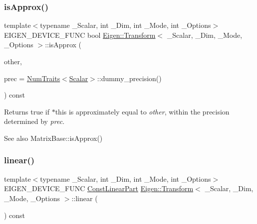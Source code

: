 \subsubsection{\texorpdfstring{isApprox()}{isApprox()}}
{\footnotesize\ttfamily template$<$typename \+\_\+\+Scalar, int \+\_\+\+Dim, int \+\_\+\+Mode, int \+\_\+\+Options$>$ \\
E\+I\+G\+E\+N\+\_\+\+D\+E\+V\+I\+C\+E\+\_\+\+F\+U\+NC bool \mbox{\hyperlink{class_eigen_1_1_transform}{Eigen\+::\+Transform}}$<$ \+\_\+\+Scalar, \+\_\+\+Dim, \+\_\+\+Mode, \+\_\+\+Options $>$\+::is\+Approx (\begin{DoxyParamCaption}\item[{const \mbox{\hyperlink{class_eigen_1_1_transform}{Transform}}$<$ \+\_\+\+Scalar, \+\_\+\+Dim, \+\_\+\+Mode, \+\_\+\+Options $>$ \&}]{other,  }\item[{const typename \mbox{\hyperlink{struct_eigen_1_1_num_traits}{Num\+Traits}}$<$ \mbox{\hyperlink{class_eigen_1_1_transform_a4e69ced9d651745b8ed4eda46f41795d}{Scalar}} $>$\+::Real \&}]{prec = {\ttfamily \mbox{\hyperlink{struct_eigen_1_1_num_traits}{Num\+Traits}}$<$\mbox{\hyperlink{class_eigen_1_1_transform_a4e69ced9d651745b8ed4eda46f41795d}{Scalar}}$>$\+:\+:dummy\+\_\+precision()} }\end{DoxyParamCaption}) const\hspace{0.3cm}{\ttfamily [inline]}}

\begin{DoxyReturn}{Returns}
{\ttfamily true} if {\ttfamily $\ast$this} is approximately equal to {\itshape other}, within the precision determined by {\itshape prec}.
\end{DoxyReturn}
\begin{DoxySeeAlso}{See also}
Matrix\+Base\+::is\+Approx() 
\end{DoxySeeAlso}
\mbox{\label{class_eigen_1_1_transform_a535bd63d047c2a36585c3f9b62219a1e}} 
\subsubsection{\texorpdfstring{linear()}{linear()}\hspace{0.1cm}{\footnotesize\ttfamily [1/2]}}
{\footnotesize\ttfamily template$<$typename \+\_\+\+Scalar, int \+\_\+\+Dim, int \+\_\+\+Mode, int \+\_\+\+Options$>$ \\
E\+I\+G\+E\+N\+\_\+\+D\+E\+V\+I\+C\+E\+\_\+\+F\+U\+NC \mbox{\hyperlink{class_eigen_1_1_transform_ac3327ee95457c915e422ff85002e02aa}{Const\+Linear\+Part}} \mbox{\hyperlink{class_eigen_1_1_transform}{Eigen\+::\+Transform}}$<$ \+\_\+\+Scalar, \+\_\+\+Dim, \+\_\+\+Mode, \+\_\+\+Options $>$\+::linear (\begin{DoxyParamCaption}{ }\end{DoxyParamCaption}) const\hspace{0.3cm}{\ttfamily [inline]}}

